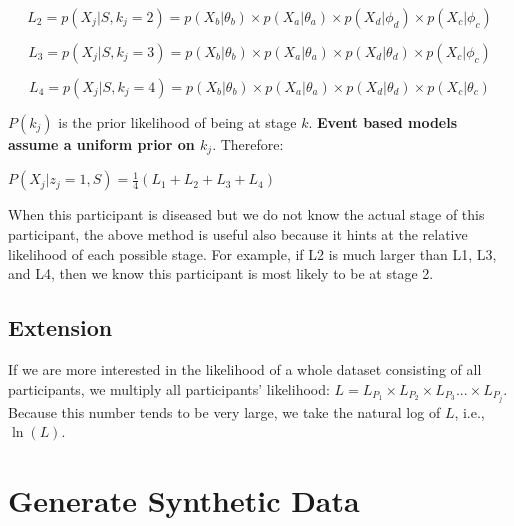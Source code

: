 \documentclass[
  letterpaper,
  DIV=11,
  numbers=noendperiod]{scrreprt}
\begin{document}
\[L_2 = p(X_j | S, k_j = 2) = p (X_b | \theta_b) \times p (X_a | \theta_a) \times p (X_d | \phi_d) \times p (X_c | \phi_c)\]

\[L_3 = p(X_j | S, k_j = 3) = p (X_b | \theta_b) \times p (X_a | \theta_a) \times p (X_d | \theta_d) \times p (X_c | \phi_c)\]

\[L_4 = p(X_j | S, k_j = 4) = p (X_b | \theta_b) \times p (X_a | \theta_a) \times p (X_d | \theta_d) \times p (X_c | \theta_c)\]

\(P(k_j)\) is the prior likelihood of being at stage \(k\).
\textbf{Event based models assume a uniform prior on \(k_j\)}.
Therefore:

\(P(X_{j} | z_j=1, S) = \frac{1}{4} \left(L_1 + L_2 + L_3 + L_4 \right)\)

\begin{tcolorbox}[enhanced jigsaw, bottomrule=.15mm, colback=white, bottomtitle=1mm, titlerule=0mm, arc=.35mm, breakable, rightrule=.15mm, opacityback=0, leftrule=.75mm, opacitybacktitle=0.6, colframe=quarto-callout-tip-color-frame, coltitle=black, toptitle=1mm, colbacktitle=quarto-callout-tip-color!10!white, title=\textcolor{quarto-callout-tip-color}{\faLightbulb}\hspace{0.5em}{Tip}, left=2mm, toprule=.15mm]

When this participant is diseased but we do not know the actual stage of
this participant, the above method is useful also because it hints at
the relative likelihood of each possible stage. For example, if L2 is
much larger than L1, L3, and L4, then we know this participant is most
likely to be at stage 2.

\end{tcolorbox}

\section{Extension}\label{extension}

If we are more interested in the likelihood of a whole dataset
consisting of all participants, we multiply all participants'
likelihood:
\(L = L_{P_1} \times L_{P_2} \times L_{P_3} ... \times L_{P_j}\).
Because this number tends to be very large, we take the natural log of
\(L\), i.e., \(\ln(L)\).


\chapter{Generate Synthetic Data}\label{generate-synthetic-data}
\end{document}
